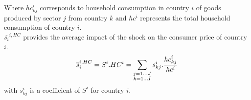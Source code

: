 \documentclass[11pt,a4paper]{article}
\begin{document}
Where ${hc}_{kj}^i$ corresponds to household consumption in country $i$ of goods produced by sector $j$ from country $k$ and $hc^i$ represents the total household consumption of country $i$. \\
$\overline{s_{i}}^{i,HC}$ provides the average impact of the shock on the consumer price of country $i$. 
 \begin{eqnarray}
\overline{s}_{i}^{i,HC}=S^i.HC^i=\underset{\begin{subarray}{c}j=1\dots J \\ k=1 \dots I \end{subarray}}{\mathop \sum}\,{{s}_{kj}^i}.\frac{{hc}_{kj}^i}{hc^i}
\label{eq:eq6}
 \end{eqnarray} 
with ${s}_{kj}^i$ is a coefficient of $S^i$ for country $i$. 
\end{document}
